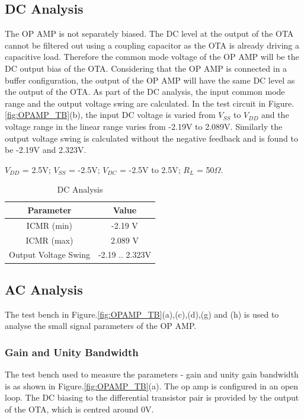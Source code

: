 \subsection{DC Analysis}
The OP AMP is not separately biased. The DC level at the output of the OTA cannot be filtered out using a coupling capacitor as the OTA is already driving a capacitive load. Therefore the common mode voltage of the OP AMP will be the DC output bias of the OTA. Considering that the OP AMP is connected in a buffer configuration, the output of the OP AMP will have the same DC level as the output of the OTA. As part of the DC analysis, the input common mode range and the output voltage swing are calculated. In the test circuit in Figure.\ref{fig:OPAMP_TB}(b), the input DC voltage is varied from $V_{SS}$ to $V_{DD}$ and the voltage range in the linear range varies from -2.19V to 2.089V. Similarly the output voltage swing is calculated without the negative feedback and is found to be -2.19V and 2.323V.

$V_{DD}$ = 2.5V; $V_{SS}$ = -2.5V; $V_{DC}$ = -2.5V to 2.5V; $R_L$ = 50$\Omega$.
\begin{table} [H]
\centering
\begin{tabular}{@{}cc@{}}
\toprule
Parameter					& Value				\\ \midrule
ICMR (min)					& -2.19 V			\\
ICMR (max)					& 2.089 V			\\
Output Voltage Swing		& -2.19 .. 2.323V	\\
\bottomrule
\end{tabular}
\caption{DC Analysis}
\label{tab:OPAMP_DC}
\end{table}

\subsection{AC Analysis}
The test bench in Figure.\ref{fig:OPAMP_TB}(a),(c),(d),(g) and (h) is used to analyse the small signal parameters of the OP AMP.
\subsubsection{Gain and Unity Bandwidth}
The test bench used to measure the parameters - gain and unity gain bandwidth is as shown in Figure.\ref{fig:OPAMP_TB}(a). The op amp is configured in an open loop. The DC biasing to the differential transistor pair is provided by the output of the OTA, which is centred around 0V. 

